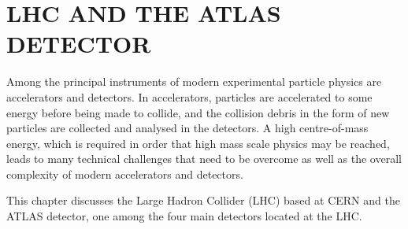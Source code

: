 \chapter{LHC AND THE ATLAS DETECTOR}\label{c:detector}

Among the principal instruments of modern experimental particle physics are
accelerators and detectors. In accelerators, particles are accelerated to some
energy before being made to collide, and the collision debris in the form of
new particles are collected and analysed in the detectors. A high
centre-of-mass energy, which is required in order that high mass scale physics
may be reached, leads to many technical challenges that need to be overcome as
well as the overall complexity of modern accelerators and detectors.

This chapter discusses the Large Hadron Collider (LHC) based at CERN and the
ATLAS detector, one among the four main detectors located at the LHC.











